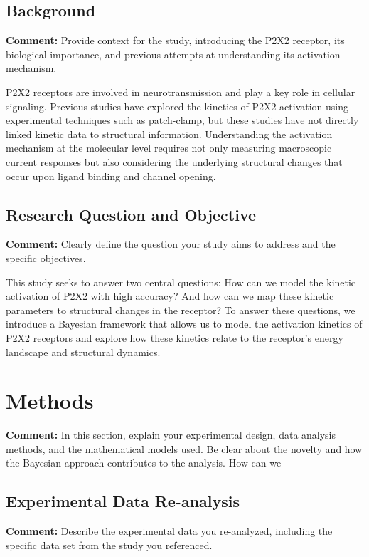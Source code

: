 \documentclass{article}
\begin{document}
	\subsection{Background}
	\textbf{Comment:} Provide context for the study, introducing the P2X2 receptor, its biological importance, and previous attempts at understanding its activation mechanism.
	
	P2X2 receptors are involved in neurotransmission and play a key role in cellular signaling. Previous studies have explored the kinetics of P2X2 activation using experimental techniques such as patch-clamp, but these studies have not directly linked kinetic data to structural information. Understanding the activation mechanism at the molecular level requires not only measuring macroscopic current responses but also considering the underlying structural changes that occur upon ligand binding and channel opening. 
	
	
	
	\subsection{Research Question and Objective}
	\textbf{Comment:} Clearly define the question your study aims to address and the specific objectives.
	
	This study seeks to answer two central questions: How can we model the kinetic activation of P2X2 with high accuracy? And how can we map these kinetic parameters to structural changes in the receptor? To answer these questions, we introduce a Bayesian framework that allows us to model the activation kinetics of P2X2 receptors and explore how these kinetics relate to the receptor's energy landscape and structural dynamics.
	
	\section{Methods}
	\textbf{Comment:} In this section, explain your experimental design, data analysis methods, and the mathematical models used. Be clear about the novelty and how the Bayesian approach contributes to the analysis.
	How can we 
	
	
	
	\subsection{Experimental Data Re-analysis}
	\textbf{Comment:} Describe the experimental data you re-analyzed, including the specific data set from the study you referenced.
	
\end{document}
